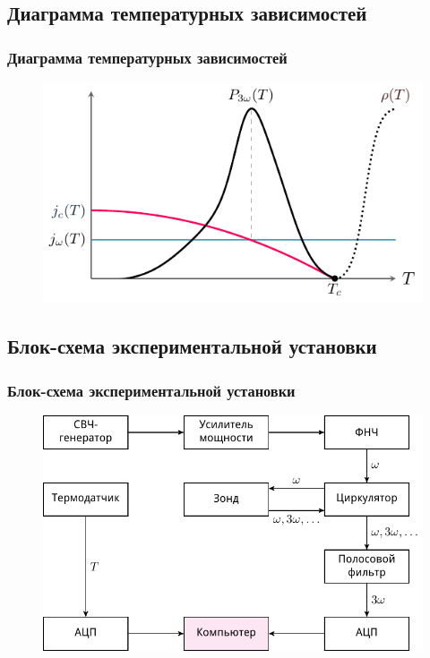 \subsection{Диаграмма температурных зависимостей}
\begin{frame}[c]%
	\frametitle{Диаграмма температурных зависимостей}
	\begin{figure}[H]
		\centering
		\includegraphics[scale=1.2]{pic/img_3a}
		\label{fig:chem}
	\end{figure}	
\end{frame}

\subsection{Блок-схема экспериментальной установки}
\begin{frame}[c]%
	\frametitle{Блок-схема экспериментальной установки}
	\vspace{-0.5em}
	\begin{figure}[H]
		\centering
		\includegraphics[]{pic/chem}
		\label{fig:chem}
	\end{figure}	
\end{frame}

